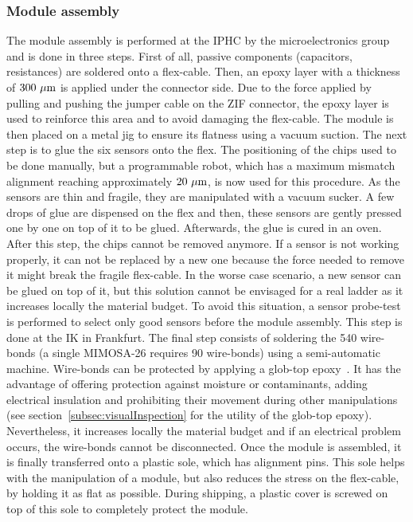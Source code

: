     \subsubsection{Module assembly}
    \label{subsec:modAssembly}

    The module assembly is performed at the \gls{IPHC} by the microelectronics group and is done in three steps.
    First of all, passive components (capacitors, resistances) are soldered onto a flex-cable.
    Then, an epoxy layer with a thickness of $300~\rm{\mu m}$ is applied under the connector side.
    Due to the force applied by pulling and pushing the jumper cable on the \gls{ZIF} connector, the epoxy layer is used to reinforce this area and to avoid damaging the flex-cable.
    The module is then placed on a metal jig to ensure its flatness using a vacuum suction.
    The next step is to glue the six sensors onto the flex.
    The positioning of the chips used to be done manually, but a programmable robot, which has a maximum mismatch alignment reaching approximately $20~\mu\rm{m}$, is now used for this procedure.
    As the sensors are thin and fragile, they are manipulated with a vacuum sucker.
    A few drops of glue are dispensed on the flex and then, these sensors are gently pressed one by one on top of it to be glued.
    Afterwards, the glue is cured in an oven. After this step, the chips cannot be removed anymore.
    If a sensor is not working properly, it can not be replaced by a new one because the force needed to remove it might break the fragile flex-cable.
    In the worse case scenario, a new sensor can be glued on top of it, but this solution cannot be envisaged for a real ladder as it increases locally the material budget.
    To avoid this situation, a sensor probe-test is performed to select only good sensors before the module assembly.
    This step is done at the IK in Frankfurt.
    The final step consists of soldering the 540 wire-bonds (a single \gls{MIMOSA}-26 requires 90 wire-bonds) using a semi-automatic machine.
    Wire-bonds can be protected by applying a glob-top epoxy~\cite{minges1989electronic}.
    It has the advantage of offering protection against moisture or contaminants, adding electrical insulation and prohibiting their movement during other manipulations (see section~\ref{subsec:visualInspection} for the utility of the glob-top epoxy). 
    Nevertheless, it increases locally the material budget and if an electrical problem occurs, the wire-bonds cannot be disconnected.
    Once the module is assembled, it is finally transferred onto a plastic sole, which has alignment pins.
    This sole helps with the manipulation of a module, but also reduces the stress on the flex-cable, by holding it as flat as possible.
    During shipping, a plastic cover is screwed on top of this sole to completely protect the module.

